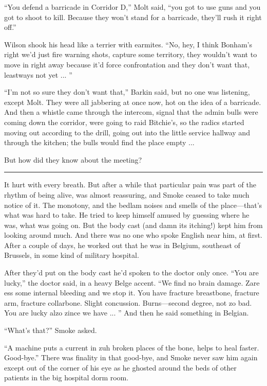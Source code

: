 ``You defend a barricade in Corridor D,'' Molt said, ``you got to use guns and you got to shoot to kill. Because they won't stand for a barricade, they'll rush it right off.''

Wilson shook his head like a terrier with earmites. ``No, hey, I think Bonham's right we'd just fire warning shots, capture some territory, they wouldn't want to move in right away because it'd force confrontation and they don't want that, leastways not yet ... ''

``I'm not so sure they don't want that,'' Barkin said, but no one was listening, except Molt. They were all jabbering at once now, hot on the idea of a barricade. And then a whistle came through the intercom, signal that the admin bulls were coming down the corridor, were going to raid Bitchie's, so the radics started moving out according to the drill, going out into the little service hallway and through the kitchen; the bulls would find the place empty ...

But how did they know about the meeting?

\fancybreak{* * *}

It hurt with every breath. But after a while that particular pain was part of the rhythm of being alive, was almost reassuring, and Smoke ceased to take much notice of it. The monotony, and the bedlam noises and smells of the place—that's what was hard to take. He tried to keep himself amused by guessing where he was, what was going on. But the body cast (and damn its itching!) kept him from looking around much. And there was no one who spoke English near him, at first. After a couple of days, he worked out that he was in Belgium, southeast of Brussels, in some kind of military hospital.

After they'd put on the body cast he'd spoken to the doctor only once. ``You are lucky,'' the doctor said, in a heavy Belge accent. ``We find no brain damage. Zare ess some internal bleeding and we stop it. You have fracture breastbone, fracture arm, fracture collarbone. Slight concussion. Burns—second degree, not zo bad. You are lucky alzo zince we have ... '' And then he said something in Belgian.

``What's that?'' Smoke asked.

``A machine puts a current in zuh broken places of the bone, helps to heal faster. Good-bye.'' There was finality in that good-bye, and Smoke never saw him again except out of the corner of his eye as he ghosted around the beds of other patients in the big hospital dorm room.

